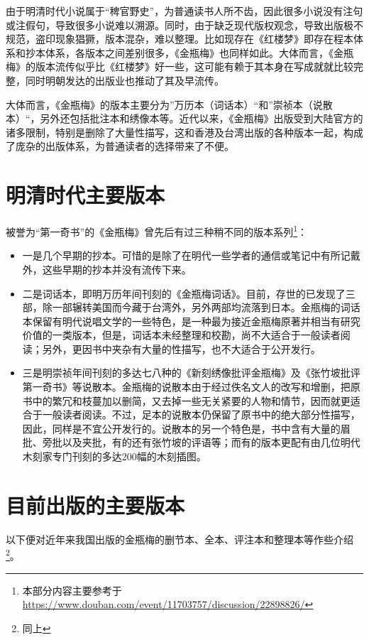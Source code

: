 由于明清时代小说属于“稗官野史”，为普通读书人所不齿，因此很多小说没有注句或注假句，导致很多小说难以溯源。同时，由于缺乏现代版权观念，导致出版极不规范，盗印现象猖獗，版本混杂，难以整理。比如现存在《红楼梦》即存在程本体系和抄本体系，各版本之间差别很多，《金瓶梅》也同样如此。大体而言，《金瓶梅》的版本流传似乎比《红楼梦》好一些，这可能有赖于其本身在写成就就比较完整，同时明朝发达的出版业也推动了其及早流传。

大体而言，《金瓶梅》的版本主要分为”万历本（词话本）“和”崇祯本（说散本）“，另外还包括批注本和绣像本等。近代以来，《金瓶梅》出版受到大陆官方的诸多限制，特别是删除了大量性描写，这和香港及台湾出版的各种版本一起，构成了庞杂的出版体系，为普通读者的选择带来了不便。

\section{明清时代主要版本}
被誉为“第一奇书”的《金瓶梅》曾先后有过三种稍不同的版本系列\footnote{本部分内容主要参考于\url{https://www.douban.com/event/11703757/discussion/22898826/}}：
\begin{itemize}
	\item 一是几个早期的抄本。可惜的是除了在明代一些学者的通信或笔记中有所记戴外，这些早期的抄本并没有流传下来。
	\item 二是词话本，即明万历年间刊刻的《金瓶梅词话》。目前，存世的已发现了三部，除一部辗转美国而今藏于台湾外，另外两部均流落到日本。金瓶梅的词话本保留有明代说唱文学的一些特色，是一种最为接近金瓶梅原著并相当有研究价值的一类版本，但是，词话本未经整理和校勘，尚不大适合于一般读者阅读；另外，更因书中夹杂有大量的性描写，也不大适合于公开发行。
	\item 三是明崇祯年间刊刻的多达七八种的《新刻绣像批评金瓶梅》及《张竹坡批评第一奇书》等说散本。金瓶梅的说散本由于经过佚名文人的改写和增删，把原书中的繁冗和枝蔓加以删简，又去掉一些无关紧要的人物和情节，因而就更适合于一般读者阅读。不过，足本的说散本仍保留了原书中的绝大部分性描写，因此，同样是不宜公开发行的。说散本的另一个特色是，书中含有大量的眉批、旁批以及夹批，有的还有张竹坡的评语等；而有的版本更配有由几位明代木刻家专门刊刻的多达200幅的木刻插图。
\end{itemize}




\section{目前出版的主要版本}
以下便对近年来我国出版的金瓶梅的删节本、全本、评注本和整理本等作些介绍\footnote{同上}。

